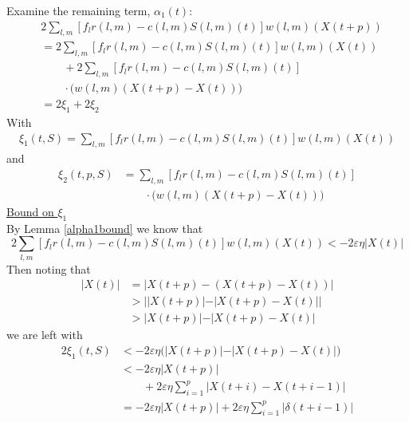 Examine the remaining  term, $\alpha_1(t)$: %
\begin{align} \nonumber 
&2\sum_{l,m} [f_{l}  r(l,m) -  c(l,m)S(l,m)(t) ]  w(l,m)(X(t + p))   \\ \nonumber
&=  2\sum_{l,m} [f_{l}r(l,m) - c(l,m)S(l,m)(t) ]w(l,m)(X(t) )  \\ \nonumber
& \qquad  + 2\sum_{l,m} [f_{l}r(l,m) - c(l,m)S(l,m)(t) ] \\ \nonumber 
&\qquad \cdot \big(w(l,m)(X(t + p ) - X(t))\big) \\ \nonumber
&= 2 \xi_{1} + 2 \xi_{2}
\label{2terms}
\end{align}
With
\begin{align} 
\xi_{1} (t,S) = \sum_{l,m} \left[f_{l}r(l,m) - c(l,m)S(l,m)(t) \right]w(l,m)(X(t) )
\end{align}
and
\begin{align}\nonumber
\xi_{2} (t,p,S) &= \sum_{l,m} \left[f_{l}r(l,m) - c(l,m)S(l,m)(t) \right]\\
&\qquad \cdot\big(w(l,m)(X(t + p ) - X(t))\big)
\end{align}
\underline{Bound on $\xi_{1}$} \\
By Lemma \ref{alpha1bound} we know that
\begin{equation*}
2\sum_{l,m} [f_{l}r(l,m) - c(l,m)S(l,m)(t) ]w(l,m)(X(t )) < -2\varepsilon \eta \vert X(t) \vert
\end{equation*}
Then noting that
\begin{align*}
\vert X(t) \vert &= \vert X(t + p) - (X(t + p) - X(t)) \vert \\
&> \big\vert \vert X(t + p) \vert - \vert  X(t + p) - X(t)   \vert  \big\vert \\
&>  \vert X(t + p) \vert - \vert  X(t + p) - X(t)   \vert  
\end{align*}
we are left with
\begin{align} \nonumber
2\xi_1 (t,S) &< -2\varepsilon \eta \big( \vert X(t + p) \vert -  \vert  X(t + p) - X(t)   \vert \big)\\ \nonumber
&< -2\varepsilon \eta   \vert X(t + p) \vert \\  \nonumber
&\qquad + 2\varepsilon \eta\sum_{i=1}^{p} \vert  X(t + i) - X(t + i - 1)   \vert  \\ 
&= -2\varepsilon \eta   \vert X(t + p) \vert + 2\varepsilon \eta\sum_{i=1}^{p} \vert \delta(t + i -1) \vert 
\label{sump}
\end{align}
